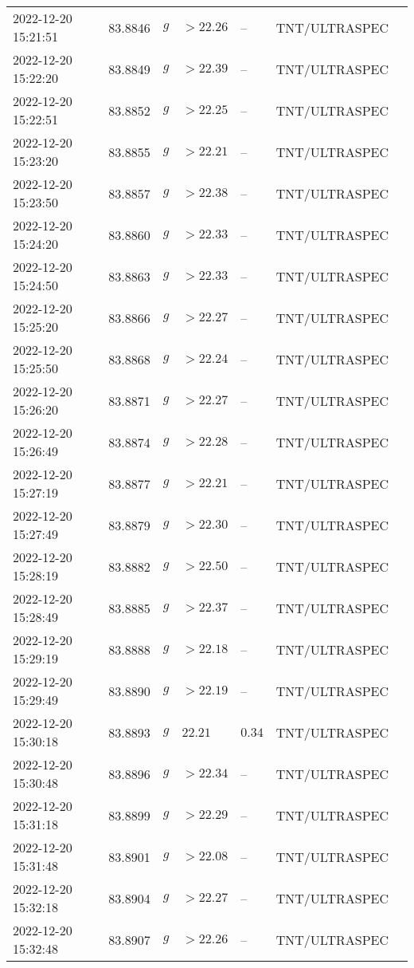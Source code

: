 \documentclass{nature_plusfigure}
\begin{document}
\begin{supplement}
\begin{center}
\begin{longtable}{lllllll}
2022-12-20 15:21:51 & 83.8846 & $g$ & $>22.26$ & -- & TNT/ULTRASPEC &  \\ 
2022-12-20 15:22:20 & 83.8849 & $g$ & $>22.39$ & -- & TNT/ULTRASPEC &  \\ 
2022-12-20 15:22:51 & 83.8852 & $g$ & $>22.25$ & -- & TNT/ULTRASPEC &  \\ 
2022-12-20 15:23:20 & 83.8855 & $g$ & $>22.21$ & -- & TNT/ULTRASPEC &  \\ 
2022-12-20 15:23:50 & 83.8857 & $g$ & $>22.38$ & -- & TNT/ULTRASPEC &  \\ 
2022-12-20 15:24:20 & 83.8860 & $g$ & $>22.33$ & -- & TNT/ULTRASPEC &  \\ 
2022-12-20 15:24:50 & 83.8863 & $g$ & $>22.33$ & -- & TNT/ULTRASPEC &  \\ 
2022-12-20 15:25:20 & 83.8866 & $g$ & $>22.27$ & -- & TNT/ULTRASPEC &  \\ 
2022-12-20 15:25:50 & 83.8868 & $g$ & $>22.24$ & -- & TNT/ULTRASPEC &  \\ 
2022-12-20 15:26:20 & 83.8871 & $g$ & $>22.27$ & -- & TNT/ULTRASPEC &  \\ 
2022-12-20 15:26:49 & 83.8874 & $g$ & $>22.28$ & -- & TNT/ULTRASPEC &  \\ 
2022-12-20 15:27:19 & 83.8877 & $g$ & $>22.21$ & -- & TNT/ULTRASPEC &  \\ 
2022-12-20 15:27:49 & 83.8879 & $g$ & $>22.30$ & -- & TNT/ULTRASPEC &  \\ 
2022-12-20 15:28:19 & 83.8882 & $g$ & $>22.50$ & -- & TNT/ULTRASPEC &  \\ 
2022-12-20 15:28:49 & 83.8885 & $g$ & $>22.37$ & -- & TNT/ULTRASPEC &  \\ 
2022-12-20 15:29:19 & 83.8888 & $g$ & $>22.18$ & -- & TNT/ULTRASPEC &  \\ 
2022-12-20 15:29:49 & 83.8890 & $g$ & $>22.19$ & -- & TNT/ULTRASPEC &  \\ 
2022-12-20 15:30:18 & 83.8893 & $g$ & $22.21$ & $0.34$ & TNT/ULTRASPEC &  \\ 
2022-12-20 15:30:48 & 83.8896 & $g$ & $>22.34$ & -- & TNT/ULTRASPEC &  \\ 
2022-12-20 15:31:18 & 83.8899 & $g$ & $>22.29$ & -- & TNT/ULTRASPEC &  \\ 
2022-12-20 15:31:48 & 83.8901 & $g$ & $>22.08$ & -- & TNT/ULTRASPEC &  \\ 
2022-12-20 15:32:18 & 83.8904 & $g$ & $>22.27$ & -- & TNT/ULTRASPEC &  \\ 
2022-12-20 15:32:48 & 83.8907 & $g$ & $>22.26$ & -- & TNT/ULTRASPEC &  \\ 

\end{longtable}
\end{center}
\end{supplement}
\end{document}
